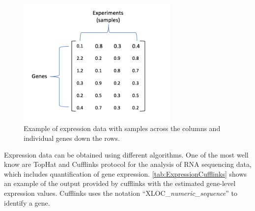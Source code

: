 \documentclass[11pt, oneside]{article}   	%
\begin{document}
\begin{figure}[!ht]
	\centering
	\includegraphics[width=0.7\textwidth]{example_expression_data}
	\caption{Example of expression data with samples across the columns and individual genes down the rows.}
	\label{fig:ExpressionData}
\end{figure}


Expression data can be obtained using different algorithms. One of the most well know are TopHat and Cufflinks protocol for the analysis of RNA sequencing data, which includes quantification of gene expression. \autoref{tab:ExpressionCufflinks} shows an example of the output provided by cufflinks with the estimated gene-level expression values. Cufflinks uses the notation ``XLOC\_{\it numeric\_sequence}'' to identify a gene.
\end{document}
